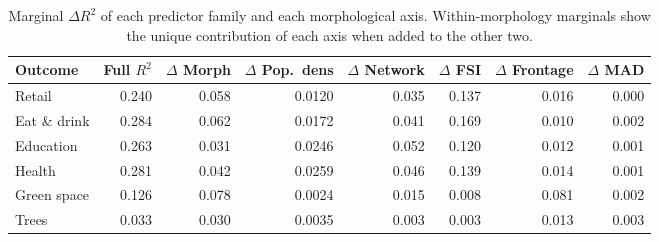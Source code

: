 \begin{table}[ht]
  \centering
  \caption{Marginal $\Delta R^2$ of each predictor family and each morphological axis.
    Within-morphology marginals show the unique contribution of each axis
    when added to the other two.}
  \label{tab:marginal}
  \small
  \begin{tabular}{lrrrrrrr}
    \toprule
    Outcome & Full $R^2$ & $\Delta$ Morph & $\Delta$ Pop.~dens & $\Delta$ Network & $\Delta$ FSI & $\Delta$ Frontage & $\Delta$ MAD \\
    \midrule
    Retail & 0.240 & 0.058 & 0.0120 & 0.035 & 0.137 & 0.016 & 0.000 \\
    Eat \& drink & 0.284 & 0.062 & 0.0172 & 0.041 & 0.169 & 0.010 & 0.002 \\
    Education & 0.263 & 0.031 & 0.0246 & 0.052 & 0.120 & 0.012 & 0.001 \\
    Health & 0.281 & 0.042 & 0.0259 & 0.046 & 0.139 & 0.014 & 0.001 \\
    Green space & 0.126 & 0.078 & 0.0024 & 0.015 & 0.008 & 0.081 & 0.002 \\
    Trees & 0.033 & 0.030 & 0.0035 & 0.003 & 0.003 & 0.013 & 0.003 \\
    \bottomrule
  \end{tabular}
\end{table}

